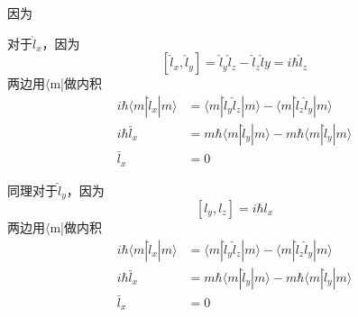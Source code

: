 因为

对于$\hat{l}_x$，因为
$$
\left[ \hat{l}_x,\hat{l}_y \right]=\hat{l}_y\hat{l}_z-\hat{l}_z\hat{l}y =i\hbar \hat{l}_z
$$
两边用$\langle$m|做内积
\begin{align}
i\hbar \left. \langle m|\hat{l}_x|m \right. \rangle &=\langle m|\hat{l}_y\hat{l}_z|m\rangle -\left. \langle m\left| \hat{l}_z\hat{l}_y \right|m \right. \rangle\\
	i\hbar \bar{l}_x&=m\hbar \langle m|\hat{l}_y|m\rangle -m\hbar \left. \langle m|\hat{l}_y|m \right. \rangle \\
	\bar{l}_x&=0
\end{align}

同理对于$\hat{l}_y$，因为
$$
\left[ l_y,l_z \right] =i\hbar l_x
$$
两边用$\langle$m|做内积
\begin{align}
i\hbar \left. \langle m|\hat{l}_x|m \right. \rangle &=\langle m|\hat{l}_y\hat{l}_z|m\rangle -\left. \langle m\left| \hat{l}_z\hat{l}_y \right|m \right. \rangle\\
	i\hbar \bar{l}_x&=m\hbar \langle m|\hat{l}_y|m\rangle -m\hbar \left. \langle m|\hat{l}_y|m \right. \rangle \\
	\bar{l}_x&=0
\end{align}